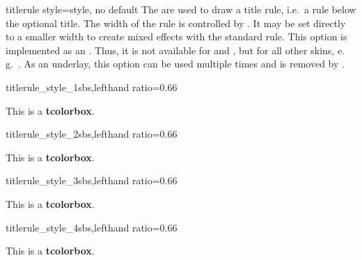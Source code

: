\clearpage


\begin{docTcbKey}[][doc new=2015-01-14]{titlerule style}{=}{style, no default}
  The  are used to draw a title rule,
  i.e.\ a rule below the optional title. The width of the rule is controlled
  by . It may be set directly to a smaller width
  to create mixed effects with the standard rule.
  This option is implemented as an . Thus, it is not
  available for  and , but for
  all other skins, e.\,g.\ .
  As an underlay, this option can be used multiple times and is removed
  by .
\begin{exdispExample*}{titlerule_style_1}{sbs,lefthand ratio=0.66}
\begin{tcolorbox}[enhanced,
  colback=red!5!white,colframe=red!75!black,
  colbacktitle=red!50!yellow,fonttitle=\bfseries,
  title=My title,
  titlerule=1mm,
  titlerule style=yellow  ]
This is a \textbf{tcolorbox}.
\end{tcolorbox}
\end{exdispExample*}

\begin{exdispExample*}{titlerule_style_2}{sbs,lefthand ratio=0.66}
\begin{tcolorbox}[enhanced,
  colback=red!5!white,colframe=red!75!black,
  colbacktitle=red!50!yellow,fonttitle=\bfseries,
  title=My title,
  titlerule=1mm,
  titlerule style={yellow,line width=0.5mm}  ]
This is a \textbf{tcolorbox}.
\end{tcolorbox}
\end{exdispExample*}

\begin{exdispExample*}{titlerule_style_3}{sbs,lefthand ratio=0.66}
\begin{tcolorbox}[enhanced,
  colback=red!10!white,colframe=red!75!black,
  colbacktitle=red!50!yellow,fonttitle=\bfseries,
  frame hidden,
  title=My title,
  boxrule=0pt,titlerule=1mm,
  titlerule style=red!50!black  ]
This is a \textbf{tcolorbox}.
\end{tcolorbox}
\end{exdispExample*}

\begin{exdispExample*}{titlerule_style_4}{sbs,lefthand ratio=0.66}
\begin{tcolorbox}[empty,
  coltitle=red!75!black,fonttitle=\bfseries,
  borderline horizontal={0.5mm}{0pt}{red!50!white},
  title=My title,
  titlerule style={red,
    arrows = {Hooks[arc=270]-Hooks[arc=270]}} ]
This is a \textbf{tcolorbox}.
\end{tcolorbox}
\end{exdispExample*}
\end{docTcbKey}

